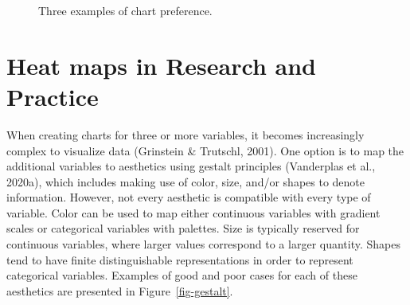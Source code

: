 \documentclass[phd]{nuthesis}
\begin{document}
\begin{figure}

\begin{minipage}{0.50\linewidth}
Three examples of chart preference.\end{minipage}%

\end{figure}%

\section{Heat maps in Research and
Practice}\label{heat-maps-in-research-and-practice}

When creating charts for three or more variables, it becomes
increasingly complex to visualize data (Grinstein \& Trutschl, 2001).
One option is to map the additional variables to aesthetics using
gestalt principles (Vanderplas et al., 2020a), which includes making use
of color, size, and/or shapes to denote information. However, not every
aesthetic is compatible with every type of variable. Color can be used
to map either continuous variables with gradient scales or categorical
variables with palettes. Size is typically reserved for continuous
variables, where larger values correspond to a larger quantity. Shapes
tend to have finite distinguishable representations in order to
represent categorical variables. Examples of good and poor cases for
each of these aesthetics are presented in Figure~\ref{fig-gestalt}.
\end{document}
